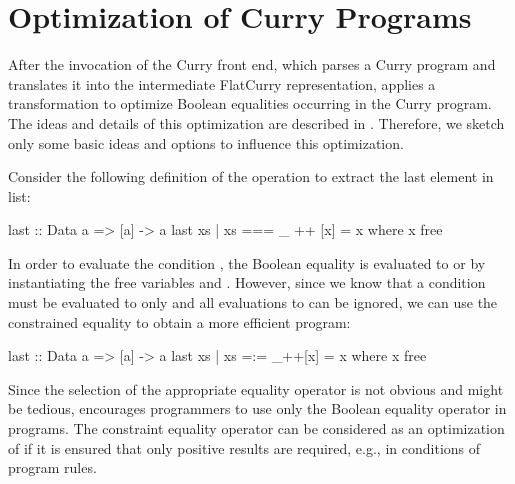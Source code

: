 \section{Optimization of Curry Programs}

After the invocation of the Curry front end,
which parses a Curry program and translates it into the intermediate FlatCurry
representation, \CYS applies a transformation
to optimize Boolean equalities occurring in the Curry program.
The ideas and details of this optimization are described
in \cite{AntoyHanus15LOPSTR}.
Therefore, we sketch only some basic ideas and options
to influence this optimization.

Consider the following definition of the operation 
to extract the last element in list:
%
\begin{curry}
last :: Data a => [a] -> a
last xs | xs === _ ++ [x]
        = x
 where x free
\end{curry}
%
In order to evaluate the condition ,
the Boolean equality is evaluated to  or 
by instantiating the free variables \code{\us} and .
However, since we know that a condition must be evaluated to
 only and all evaluations to  can be ignored,
we can use the constrained equality to obtain a more efficient program:
%
\begin{curry}
last :: Data a => [a] -> a
last xs | xs =:= _++[x]
        = x
 where x free
\end{curry}
%
Since the selection of the appropriate equality operator
is not obvious and might be tedious, \CYS encourages
programmers to use only the Boolean equality operator \ccode{===}
in programs.
The constraint equality operator \ccode{=:=} can be considered
as an optimization of \ccode{===} if it is ensured that only
positive results are required, e.g., in conditions of program rules.

